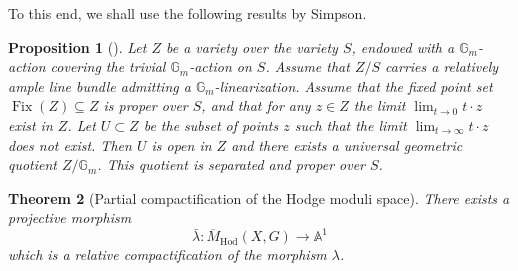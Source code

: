 \documentclass[JEP,XML,SOM,Unicode, NoEqCountersInSection,NoFloatCountersInSection,published]{cedram}
\newtheorem{thm}{Theorem}[section]
\newtheorem{prop}[thm]{Proposition}
\theoremstyle{definition}
\newcommand{\Aff}{\mathbb{A}}
\newcommand{\Gm}{\mathbb{G}_m}
\newcommand{\Fix}{\operatorname{Fix}}
\newcommand{\bMHodG}{\overline{M}_{\mathrm{Hod}}(X,G)}
\begin{document}
To this end, we shall use the following results by Simpson.

\begin{prop}[{\cite[Th.\,11.2]{Simpson1997}}]\label{geometricquotient}
Let $Z$ be a variety over the variety
$S$, endowed with a $\Gm$\nobreakdash-action covering the trivial $\Gm$\nobreakdash-action on $S$. Assume that $Z/S$ carries a relatively ample line
bundle admitting a $\Gm$\nobreakdash-linearization. Assume that the fixed point set $\Fix(Z) \subseteq Z$ is proper over
$S$, and that for any $z \in Z$ the limit $\lim_{t \to 0} t \cdot z$ exist in $Z$. Let $U \subset Z$ be the subset of points $z$ such that the limit $\lim_{t \to \infty} t \cdot z$ does
not exist. Then $U$ is open in $Z$ and there exists
a universal geometric quotient $Z/\Gm$. This quotient is separated and proper over $S$.
\end{prop}
\begin{thm}[Partial compactification of the Hodge moduli space]\label{thm:compactification}
There exists a projective morphism
\[
\bar{\lambda}\colon \bMHodG \to \Aff^1
\]
which is a relative compactification of the morphism $\lambda$.
\end{thm}
\end{document}
